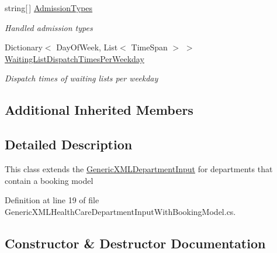 \begin{DoxyCompactItemize}
string\mbox{[}$\,$\mbox{]} \hyperlink{class_general_health_care_elements_1_1_input_1_1_generic_x_m_l_h_c_dep_input_with_admission_and_booking_model_ab20387c2135f21e2fc69a0b57d0356ec}{Admission\+Types}
\begin{DoxyCompactList}\small\item\em Handled admission types \end{DoxyCompactList}\item 
Dictionary$<$ Day\+Of\+Week, List$<$ Time\+Span $>$ $>$ \hyperlink{class_general_health_care_elements_1_1_input_1_1_generic_x_m_l_h_c_dep_input_with_admission_and_booking_model_a9eb9c206e3192cdb0905e1f93e5dbc1a}{Waiting\+List\+Dispatch\+Times\+Per\+Weekday}
\begin{DoxyCompactList}\small\item\em Dispatch times of waiting lists per weekday \end{DoxyCompactList}\end{DoxyCompactItemize}
\subsection*{Additional Inherited Members}


\subsection{Detailed Description}
This class extends the \hyperlink{class_general_health_care_elements_1_1_input_1_1_generic_x_m_l_department_input}{Generic\+X\+M\+L\+Department\+Input} for departments that contain a booking model 



Definition at line 19 of file Generic\+X\+M\+L\+Health\+Care\+Department\+Input\+With\+Booking\+Model.\+cs.



\subsection{Constructor \& Destructor Documentation}
